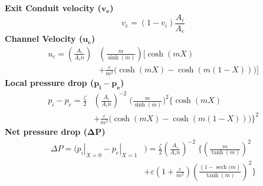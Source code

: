 \documentclass[twocolumn,10pt,cleanfoot]{ihmtc}
\begin{document}
%
%
\textbf{Exit Conduit velocity ($\bm{v_e}$)}
\begin{equation}\label{ve}
{v}_{e}=\left( 1-{v}_{i} \right)\frac{{A}_{i}}{{A}_{e}}
\end{equation}
%
%
\textbf{Channel Velocity ($\bm{u_c}$)}
\begin{equation} \label{uc} 
\begin{split}
{u}_{c}=\left(\frac{{A}_{i}}{{{A}_{c}}n} \right) & \left( \frac{m}{\sinh (m)} \right) \Biggl[ \cosh (mX)  \\ 
 & + \frac{\varepsilon }{{m}^{2}}\biggl( \cosh (mX)-\cosh (m(1-X)) \biggr) \Biggr]
\end{split}
\end{equation}
%
%
\textbf{Local pressure drop ($\bm{p_i-p_e}$)}
\begin{equation} \label{dp} 
\begin{split}
{p}_{i}-{p}_{e}=\frac{\zeta}{2} & \left( \frac{{A}_{i}}{{{A}_{c}}n} \right)^{-2}\; {\biggl( \frac{m}{\sinh (m)} \biggr)}^{2}\Biggl\{ \cosh (mX)\\
& +\frac{\varepsilon }{{m}^{2}}\biggl( \cosh (mX) - \cosh (m(1-X)) \biggr) \Biggr\}^{2}
\end{split}
\end{equation}
%
%
\textbf{Net pressure drop ($\bm{\Delta P}$)}
\begin{equation} \label{netdp} 
\begin{split}
\Delta P=\biggl({{\left. {{p}_{i}} \right|}_{X=0}}-{{\left. {{p}_{e}} \right|}_{X=1}}&\biggr)=\frac{\zeta}{2} {\left( \frac{{A}_{i}}{{{A}_{c}}n} \right)}^{-2}\; \Biggl\{{{\left( \frac{m}{\tanh (m)} \right)}^{2}} \\
& +\varepsilon \left( 1+\frac{\varepsilon }{{{m}^{2}}} \right){{\left( \frac{\left( 1-\operatorname{sech}(m \right)}{\tanh (m)} \right)}^{2}} \Biggr\}  
\end{split}
\end{equation} 
%
%
\end{document}
